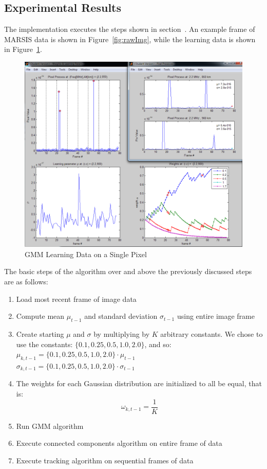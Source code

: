 \subsection{Experimental Results}
The \citet{cvmarsis} implementation executes the steps shown in section~\label{TechSum}. 
An example frame of MARSIS data is shown in Figure~\ref{fig:rawImg}, while the learning data is shown in Figure~\ref{fig:learnData}.  
\begin{figure}	\centering
	\includegraphics[trim=0 0 0 50,clip,width=\textwidth]{gfx/2107_22MHz}
	\caption{GMM Learning Data on a Single Pixel}\label{fig:learnData}
\end{figure}
The basic steps of the \citet{cvmarsis} algorithm over and above the previously discussed steps are as follows:
\begin{enumerate}
	\item Load most recent frame of image data
	\item Compute mean $\mu_{t-1}$ and standard deviation $\sigma_{t-1}$ using entire image frame
	
	\item Create starting $\mu$ and $\sigma$ by multiplying by $K$ arbitrary constants. We chose to use the constants: $\{ 0.1,0.25,0.5,1.0,2.0\}$, and so: \\
	
	$\mu_{k,t-1}=\{ 0.1,0.25,0.5,1.0,2.0\}\cdot\mu_{t-1}$ \\
	$\sigma_{k,t-1}=\{0.1,0.25,0.5,1.0,2.0\}\cdot\sigma_{t-1}$
	
	\item The weights for each Gaussian distribution are initialized to all be equal, that is:
	\[
	\omega_{k,t-1}=\frac{1}{K}
	\]
	\item Run GMM algorithm 
	\item Execute connected components algorithm on entire frame of data
	\item Execute tracking algorithm on sequential frames of data
\end{enumerate}


